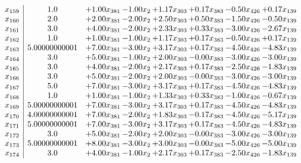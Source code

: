 \documentclass[8pt]{article}
\begin{document}
\[\begin{array}{c| c c@{\hskip 2pt} c@{\hskip 2pt} c@{\hskip 2pt} c@{\hskip 2pt} c@{\hskip 2pt} c@{\hskip 2pt} }
 x_{159}   &  1.0 & +  1.00 x_{381} & -1.00 x_{2} & +  1.17 x_{303} & +  0.17 x_{383} & -0.50 x_{426} & +  0.17 x_{139}\\
 x_{160}   &  2.0 & +  2.00 x_{381} & -2.00 x_{2} & +  2.50 x_{303} & +  0.50 x_{383} & -1.50 x_{426} & -0.50 x_{139}\\
 x_{161}   &  3.0 & +  4.00 x_{381} & -2.00 x_{2} & +  2.33 x_{303} & +  0.33 x_{383} & -3.00 x_{426} & -2.67 x_{139}\\
 x_{162}   &  1.0 & +  1.00 x_{381} & -1.00 x_{2} & +  1.17 x_{303} & +  0.17 x_{383} & -0.50 x_{426} & +  0.17 x_{139}\\
 x_{163}   &  5.00000000001 & +  7.00 x_{381} & -3.00 x_{2} & +  3.17 x_{303} & +  0.17 x_{383} & -4.50 x_{426} & -4.83 x_{139}\\
 x_{164}   &  3.0 & +  5.00 x_{381} & -1.00 x_{2} & +  2.00 x_{303} & -0.00 x_{383} & -3.00 x_{426} & -3.00 x_{139}\\
 x_{165}   &  3.0 & +  4.00 x_{381} & -2.00 x_{2} & +  2.17 x_{303} & +  0.17 x_{383} & -2.50 x_{426} & -1.83 x_{139}\\
 x_{166}   &  3.0 & +  5.00 x_{381} & -2.00 x_{2} & +  2.00 x_{303} & -0.00 x_{383} & -3.00 x_{426} & -3.00 x_{139}\\
 x_{167}   &  5.0 & +  7.00 x_{381} & -3.00 x_{2} & +  3.17 x_{303} & +  0.17 x_{383} & -4.50 x_{426} & -4.83 x_{139}\\
 x_{168}   &  1.0 & +  1.00 x_{381} & -1.00 x_{2} & +  1.33 x_{303} & +  0.33 x_{383} & -1.00 x_{426} & -0.67 x_{139}\\
 x_{169}   &  5.00000000001 & +  7.00 x_{381} & -3.00 x_{2} & +  3.17 x_{303} & +  0.17 x_{383} & -4.50 x_{426} & -4.83 x_{139}\\
 x_{170}   &  4.00000000001 & +  7.00 x_{381} & -2.00 x_{2} & +  1.83 x_{303} & -0.17 x_{383} & -4.50 x_{426} & -5.17 x_{139}\\
 x_{171}   &  5.00000000001 & +  7.00 x_{381} & -3.00 x_{2} & +  3.17 x_{303} & +  0.17 x_{383} & -4.50 x_{426} & -4.83 x_{139}\\
 x_{172}   &  3.0 & +  5.00 x_{381} & -2.00 x_{2} & +  2.00 x_{303} & -0.00 x_{383} & -3.00 x_{426} & -3.00 x_{139}\\
 x_{173}   &  5.00000000001 & +  8.00 x_{381} & -3.00 x_{2} & +  3.00 x_{303} & -0.00 x_{383} & -5.00 x_{426} & -5.00 x_{139}\\
 x_{174}   &  3.0 & +  4.00 x_{381} & -1.00 x_{2} & +  2.17 x_{303} & +  0.17 x_{383} & -2.50 x_{426} & -1.83 x_{139}\\

\end{array}\]
\end{document}
